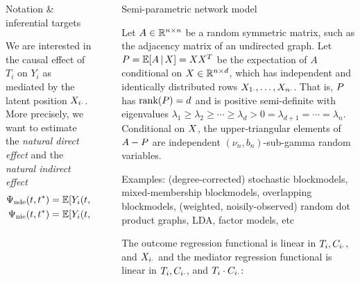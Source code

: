 \documentclass[final]{beamer}
\newlength{\sepwidth}
\newlength{\colwidth}
\newcommand{\separatorcolumn}{\begin{column}{\sepwidth}\end{column}}
\begin{document}
\begin{frame}[t]
\begin{columns}[t]
\begin{column}{\colwidth}
\begin{block}{Notation \& inferential targets}
\begin{minipage}{.5\textwidth}
        \end{minipage}

        We are interested in the causal effect of $T_i$ on $Y_i$ as mediated by the latent position $X_{i \cdot}$. More precisely, we want to estimate the \emph{natural direct effect} and the \emph{natural indirect effect}
        \begin{align*}
          \ndef & = \E{Y_i(t, \X_{i \cdot}(t^*)) - Y_i(t^*, \X_{i \cdot}(t^*))} \\
          \nief & = \E{Y_i(t, \X_{i \cdot}(t)) - Y_i(t, \X_{i \cdot}(t^*))}
        \end{align*}
      \end{block}

    \end{column}

    \separatorcolumn

    \begin{column}{\colwidth}

      \begin{block}{Semi-parametric network model}

        Let $A \in \mathbb{R}^{n \times n}$ be a random symmetric matrix, such as the adjacency matrix of an undirected graph. Let $\Apop = \E[\X]{A} = \X \X^T$ be the expectation of $A$ conditional on $X \in \mathbb{R}^{n \times d}$, which has independent and identically distributed rows $X_{1 \cdot}, \dots, X_{n \cdot}$. That is, $P$ has $\rank \paren*{\Apop} = d$ and is positive semi-definite with eigenvalues $\lambda_1 \ge \lambda_2 \ge \cdots \ge \lambda_d > 0 = \lambda_{d+1} = \cdots = \lambda_n$. Conditional on $X$, the upper-triangular elements of $A - P$ are independent $(\nu_n, b_n)$-sub-gamma random variables.

        Examples: (degree-corrected) stochastic blockmodels, mixed-membership blockmodels, overlapping blockmodels, (weighted, noisily-observed) random dot product graphs, LDA, factor models, etc

        The outcome regression functional is linear in $T_i, C_{i \cdot}$, and $X_{i \cdot}$ and the mediator regression functional is linear in $T_i, C_{i \cdot}$, and $T_i \cdot C_{i \cdot}$:


\end{block}
\end{column}
\end{columns}
\end{frame}
\end{document}
